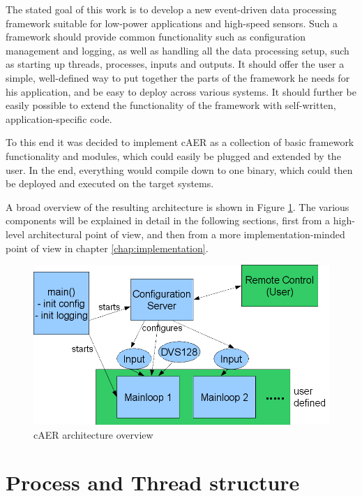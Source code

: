 \documentclass[a4paper,12pt]{report}
\begin{document}
The stated goal of this work is to develop a new event-driven data processing framework suitable for low-power applications and high-speed sensors.
Such a framework should provide common functionality such as configuration management and logging, as well as handling all the data processing setup, such as starting up threads, processes, inputs and outputs.
It should offer the user a simple, well-defined way to put together the parts of the framework he needs for his application, and be easy to deploy across various systems.
It should further be easily possible to extend the functionality of the framework with self-written, application-specific code.

To this end it was decided to implement cAER as a collection of basic framework functionality and modules, which could easily be plugged and extended by the user. In the end, everything would compile down to one binary, which could then be deployed and executed on the target systems.

A broad overview of the resulting architecture is shown in Figure \ref{fig:caer_architecture}. The various components will be explained in detail in the following sections, first from a high-level architectural point of view, and then from a more implementation-minded point of view in chapter \ref{chap:implementation}.

\begin{figure}[H]
\begin{center}
\includegraphics[width=\textwidth]{caer_architecture}
\caption{cAER architecture overview}
\label{fig:caer_architecture}
\end{center}
\end{figure}

\section{Process and Thread structure} \label{sec:process_and_thread_structure}
\end{document}
